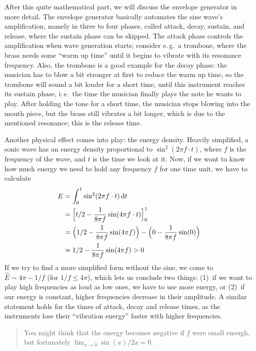 \documentclass[english]{scrartcl}
\newenvironment{details}{
\par\nobreak\noindent%
\begin{quotation}%
  \footnotesize%
  \noindent\Radioactivity%
}{
\end{quotation}
}
\begin{document}
After this quite mathematical part, we will discuss the envelope generator in more detail.
The envelope generator basically automates the sine wave's amplification, namely in three to four phases, called attack, decay, sustain, and release, where the sustain phase can be skipped.
The attack phase controls the amplification when wave generation starts; consider e.\,g.~a trombone, where the brass needs some ``warm up time'' until it begins to vibrate with its resonance frequency.
Also, the trombone is a good example for the decay phase: the musician has to blow a bit stronger at first to reduce the warm up time, so the trombone will sound a bit louder for a short time, until this instrument reaches its sustain phase, i.\,e.~the time the musician finally plays the note he wants to play.
After holding the tone for a short time, the musician stops blowing into the mouth piece, but the brass still vibrates a bit longer, which is due to the mentioned resonance; this is the release time.

Another physical effect comes into play: the energy density.
Heavily simplified, a sonic wave has an energy density proportional to $\sin^2(2 \pi f \cdot t)$, where $f$ is the frequency of the wave, and $t$ is the time we look at it.
Now, if we want to know how much energy we need to hold any frequency $f$ for one time unit, we have to calculate
\begin{align*}
  E & = \int_0^1 \sin^2(2 \pi f \cdot t)\,\mathrm{d}t \\
    & = \Bigl[ t/2 - \frac{1}{8\pi f} \sin(4\pi f \cdot t) \Bigr]_0^1 \\
    & = \Bigl(1/2 - \frac{1}{8\pi f} \sin(4\pi f)\Bigr) - \Bigl(0 - \frac{1}{8\pi f} \sin(0)\Bigr) \\
    & = 1/2 - \frac{1}{8\pi f} \sin(4\pi f) > 0
\end{align*}
If we try to find a more simplified form without the sine, we come to $\hat E \sim 4\pi - 1/f$ (for $1/f \leq 4\pi$), which lets us conclude two things: (1)~if we want to play high frequencies as loud as low ones, we have to use more energy, or (2)~if our energy is constant, higher frequencies decrease in their amplitude.
A similar statement holds for the times of attack, decay and release times, as the instruments lose their ``vibration energy'' faster with higher frequencies.
\begin{details}
	You might think that the energy becomes negative if $f$ were small enough, but fortunately $\lim_{x \to 0} \sin(x)/2x = 0$.
\end{details}
\end{document}
